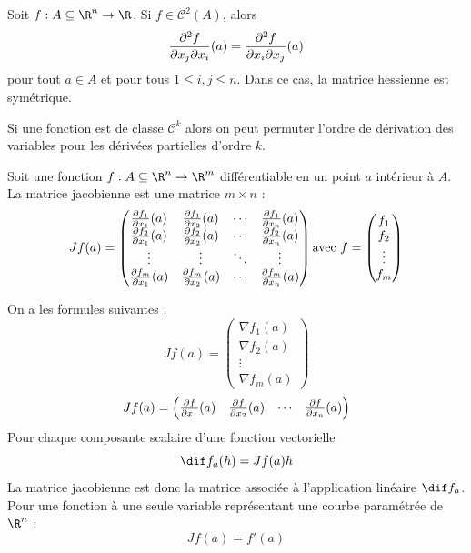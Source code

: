 \begin{myprop}
	Soit $f : A \subseteq \R^n \to \R$.
	Si $f \in \mathcal{C}^2(A)$, alors
	\[ \frac{\partial^2 f}{\partial x_j \partial x_i}(a) = \frac{\partial^2 f}{\partial x_i \partial x_j}(a) \]
	pour tout $a \in A$ et pour tous $1 \leq i,j \leq n$. Dans ce cas, la matrice hessienne est symétrique.
\end{myprop}

\begin{myprop}
	Si une fonction est de classe $\mathcal{C}^k$ alors on peut permuter l'ordre de dérivation des variables pour les dérivées partielles d'ordre $k$.
\end{myprop}

\begin{mydef}
	Soit une fonction $f : A \subseteq \R^n \to \R^m$ différentiable en un point $a$ intérieur à $A$. La matrice jacobienne est une matrice $m \times n$ :
	\[ Jf(a) =
	\begin{pmatrix}
		\frac{\partial f_1}{\partial x_1}(a) & \frac{\partial f_1}{\partial x_2}(a) & \cdots & \frac{\partial f_1}{\partial x_n}(a) \\
		\frac{\partial f_2}{\partial x_1}(a) & \frac{\partial f_2}{\partial x_2}(a) & \cdots & \frac{\partial f_2}{\partial x_n}(a) \\
		\vdots & \vdots & \ddots & \vdots \\
		\frac{\partial f_m}{\partial x_1}(a) & \frac{\partial f_m}{\partial x_2}(a) & \cdots & \frac{\partial f_m}{\partial x_n}(a) \\
	\end{pmatrix} \text{avec } f =
	\begin{pmatrix}
		f_1 \\ f_2 \\ \vdots \\ f_m
	\end{pmatrix} \]
\end{mydef}

\begin{myform}
	On a les formules suivantes :
	\[ Jf(a) =
	\begin{pmatrix} \nabla f_1(a) \\ \nabla f_2(a) \\ \vdots \\ \nabla f_m(a)
	\end{pmatrix} \]
	\[ Jf(a) =
	\begin{pmatrix} \frac{\partial f}{\partial x_1}(a) & \frac{\partial f}{\partial x_2}(a) & \cdots & \frac{\partial f}{\partial x_n}(a)
	\end{pmatrix} \]
	Pour chaque composante scalaire d'une fonction vectorielle
	\[ \dif f_a(h) = Jf(a) h \]
	La matrice jacobienne est donc la matrice associée à l'application linéaire $\dif f_a$.
	Pour une fonction à une seule variable représentant une courbe paramétrée de $\R^n$ :
	\[ Jf(a) = f'(a) \]
\end{myform}

